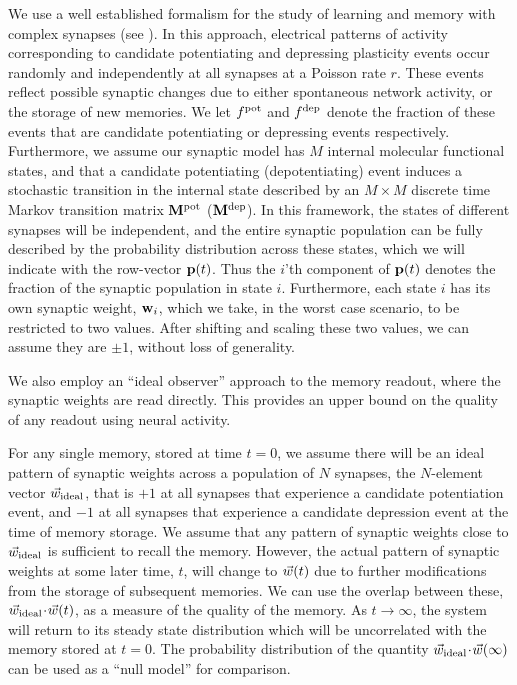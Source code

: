 We use a well established formalism for the study of learning and memory with complex synapses (see \cite{Fusi2005cascade,Fusi2007multistate,Barrett2008discrete}).
In this approach, electrical patterns of activity corresponding to candidate potentiating and depressing plasticity events occur randomly and independently at all synapses at a Poisson rate $r$.  These events reflect possible synaptic changes due to either spontaneous network activity, or the storage of new memories.
We let  $f^{\text{pot}}$ and  $f^{\text{dep}}$ denote the fraction of these events that are candidate potentiating or depressing events respectively.
Furthermore, we assume our synaptic model has $M$ internal molecular functional states, and that a candidate potentiating (depotentiating) event induces a stochastic transition in the internal state described by an $M \times M$ discrete time Markov transition matrix  $\mathbf{M}^{\text{pot}}$ ($\mathbf{M}^{\text{dep}}$).
In this framework, the states of different synapses will be independent, and the entire synaptic population can be fully described by the probability distribution across these states, which we will indicate with the row-vector $\mathbf{p}(t)$.
Thus the $i$'th component of $\mathbf{p}(t)$ denotes the fraction of the synaptic population in state $i$.
Furthermore, each state $i$ has its own synaptic weight, $\mathbf{w}_i$, which we take, in the worst case scenario, to be restricted to two values.
After shifting and scaling these two values,  we can assume they are $\pm1$, without loss of generality.

We also employ an ``ideal observer'' approach to the memory readout, where the synaptic weights are read directly.
This provides an upper bound on the quality of any readout using neural activity.

For any single memory, stored at time $t=0$, we assume there will be an ideal pattern of synaptic weights across a population of $N$ synapses, the $N$-element vector $\vec{w}_\text{ideal}$, that is $+1$ at all synapses that experience a candidate potentiation event, and $-1$ at all synapses that experience a candidate depression event at the time of memory storage.
We assume that any pattern of synaptic weights close to $\vec{w}_\text{ideal}$ is sufficient to recall the memory.
However, the actual pattern of synaptic weights at some later time, $t$, will change to $\vec{w}(t)$ due to further modifications from the storage of subsequent memories.
We can use the overlap between these, $\vec{w}_\text{ideal}\!\cdot\!\vec{w}(t)$, as a measure of the quality of the memory.
As $t\to\infty$, the system will return to its steady state distribution which will be uncorrelated with the memory stored at $t=0$.
The probability distribution of the quantity $\vec{w}_\text{ideal}\!\cdot\!\vec{w}(\infty)$ can be used as a ``null model'' for comparison.

